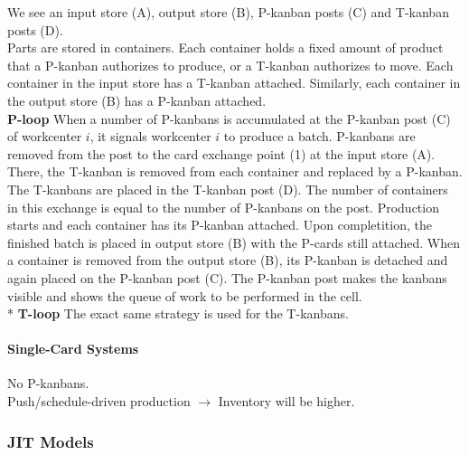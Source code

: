 \documentclass[12pt]{article}
\begin{document}
We see an input store (A), output store (B), P-kanban posts (C) and T-kanban posts (D).\\
Parts are stored in containers. Each container holds a fixed amount of product that a P-kanban authorizes to produce, or a T-kanban authorizes to move. Each container in the input store has a T-kanban attached. Similarly, each container in the output store (B) has a P-kanban attached.\\
\textbf{P-loop} When a number of P-kanbans is accumulated at the P-kanban post (C) of workcenter $i$, it signals workcenter $i$ to produce a batch.  P-kanbans are removed from the post to the card exchange point (1) at the input store (A). There, the T-kanban is removed from each container and replaced by a P-kanban. The T-kanbans are placed in the T-kanban post (D). The number of containers in this exchange is equal to the number of P-kanbans on the post. Production starts and each container has its P-kanban attached. Upon completition, the finished batch is placed in output store (B) with the P-cards still attached. When a container is removed from the output store (B), its P-kanban is detached and again placed on the P-kanban post (C). The P-kanban post makes the kanbans visible and shows the queue of work to be performed in the cell.\\*
\textbf{T-loop} The exact same strategy is used for the T-kanbans.
\paragraph{Single-Card Systems} No P-kanbans.\\
Push/schedule-driven production $\rightarrow$ Inventory will be higher.
\setcounter{subsubsection}{4}
\subsubsection{JIT Models}
\end{document}
